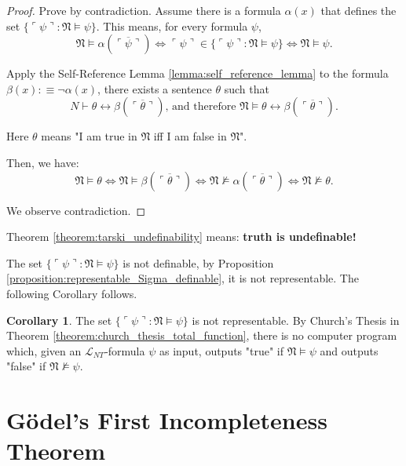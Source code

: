 \documentclass[11pt,letterpaper]{book}
\theoremstyle{definition}
\newtheorem{corollary}{Corollary}[section]
\begin{document}
\begin{proof}
Prove by contradiction. Assume there is a formula $\alpha(x)$ that defines the set $\{ \ulcorner \psi \urcorner : \mathfrak{N} \models \psi \}$. This means, for every formula $\psi$,
$$ \mathfrak{N} \models \alpha ( \overline{\ulcorner \psi \urcorner} ) \iff \ulcorner \psi \urcorner \in \{ \ulcorner \psi \urcorner : \mathfrak{N} \models \psi \} \iff \mathfrak{N} \models \psi . $$

Apply the Self-Reference Lemma \ref{lemma:self_reference_lemma} to the formula $\beta (x) : \equiv \lnot \alpha (x) $, there exists a sentence $\theta$ such that
$$ N \vdash \theta \leftrightarrow \beta ( \overline{\ulcorner \theta \urcorner} ) \text{, and therefore } \mathfrak{N} \models \theta \leftrightarrow \beta ( \overline{\ulcorner \theta \urcorner} )  . $$
 
Here $\theta$ means "I am true in $\mathfrak{N}$ iff I am false in $\mathfrak{N}$".
 
Then, we have:
$$\mathfrak{N} \models \theta \iff \mathfrak{N} \models \beta( \overline{\ulcorner \theta \urcorner} ) \iff \mathfrak{N} \not \models \alpha ( \overline{\ulcorner \theta \urcorner} ) \iff \mathfrak{N} \not \models \theta . $$

We observe contradiction.

\end{proof}

Theorem \ref{theorem:tarski_undefinability} means: \textbf{truth is undefinable!}


The set $\{ \ulcorner \psi \urcorner : \mathfrak{N} \models \psi \}$ is not definable, by Proposition \ref{proposition:representable_Sigma_definable}, it is not representable. The following Corollary follows.


\begin{corollary}
The set $\{ \ulcorner \psi \urcorner : \mathfrak{N} \models \psi \}$ is not representable. By Church's Thesis in Theorem \ref{theorem:church_thesis_total_function}, there is no computer program which, given an $\mathcal{L}_{NT}$-formula $\psi$ as input, outputs "true" if $\mathfrak{N} \models \psi$ and outputs "false" if $\mathfrak{N} \not \models \psi$.

\end{corollary}


\section{G\"odel's First Incompleteness Theorem}
\end{document}
